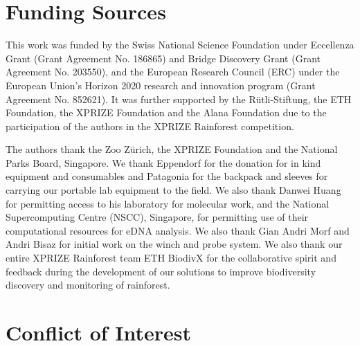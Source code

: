 
\section*{Funding Sources}

This work was funded by the Swiss National Science Foundation under Eccellenza Grant (Grant Agreement No. 186865) and Bridge Discovery Grant (Grant Agreement No. 203550), and the European Research Council (ERC) under the European Union's Horizon 2020 research and innovation program (Grant Agreement No. 852621). It was further supported by the Rütli-Stiftung, the ETH Foundation, the XPRIZE Foundation and the Alana Foundation due to the participation of the authors in the XPRIZE Rainforest competition.

\begin{acknowledgement}

The authors thank the Zoo Zürich, the XPRIZE Foundation and the National Parks Board, Singapore. We thank Eppendorf for the donation for in kind equipment and consumables and Patagonia for the backpack and sleeves for carrying our portable lab equipment to the field. We also thank Danwei Huang for permitting access to his laboratory for molecular work, and the National Supercomputing Centre (NSCC), Singapore, for permitting use of their computational resources for eDNA analysis. We also thank Gian Andri Morf and Andri Bisaz for initial work on the winch and probe system.  We also thank our entire XPRIZE Rainforest team ETH BiodivX for the collaborative spirit and feedback during the development of our solutions to improve biodiversity discovery and monitoring of rainforest.

\end{acknowledgement}

\section*{Conflict of Interest}

